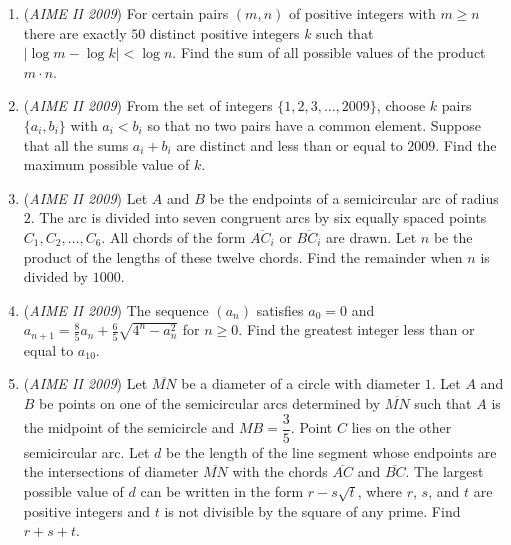 \begin{enumerate}
 

	\item (\textit{AIME II 2009}) For certain pairs $(m,n)$ of positive integers with $m\geq n$ there are exactly $50$ distinct positive integers $k$ such that $|\log m - \log k| < \log n$. Find the sum of all possible values of the product $m \cdot n$.


 

	\item (\textit{AIME II 2009}) From the set of integers $\{1,2,3,\dots,2009\}$, choose $k$ pairs $\{a_i,b_i\}$ with $a_i<b_i$ so that no two pairs have a common element. Suppose that all the sums $a_i+b_i$ are distinct and less than or equal to $2009$. Find the maximum possible value of $k$.


 

	\item (\textit{AIME II 2009}) Let $A$ and $B$ be the endpoints of a semicircular arc of radius $2$. The arc is divided into seven congruent arcs by six equally spaced points $C_1,C_2,\dots,C_6$. All chords of the form $\overline{AC_i}$ or $\overline{BC_i}$ are drawn. Let $n$ be the product of the lengths of these twelve chords. Find the remainder when $n$ is divided by $1000$.


 

	\item (\textit{AIME II 2009}) The sequence $(a_n)$ satisfies $a_0=0$ and $a_{n + 1} = \frac{8}{5}a_n + \frac{6}{5}\sqrt{4^n - a_n^2}$ for $n \geq 0$. Find the greatest integer less than or equal to $a_{10}$.


 

	\item (\textit{AIME II 2009}) Let $\overline{MN}$ be a diameter of a circle with diameter $1$. Let $A$ and $B$ be points on one of the semicircular arcs determined by $\overline{MN}$ such that $A$ is the midpoint of the semicircle and $MB=\dfrac 35$. Point $C$ lies on the other semicircular arc. Let $d$ be the length of the line segment whose endpoints are the intersections of diameter $\overline{MN}$ with the chords $\overline{AC}$ and $\overline{BC}$. The largest possible value of $d$ can be written in the form $r-s\sqrt t$, where $r$, $s$, and $t$ are positive integers and $t$ is not divisible by the square of any prime. Find $r+s+t$.


 

\end{enumerate}